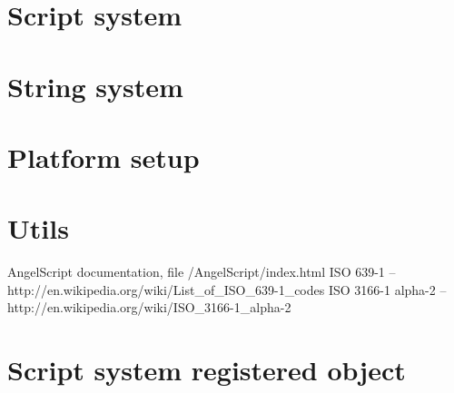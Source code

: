 \documentclass[a4paper, 12pt]{report}
\begin{document}
\chapter{Script system}



\chapter{String system}
\label{chap:string}



\chapter{Platform setup}



\chapter{Utils}
\label{chap:utils}





\begin{thebibliography}{9}
AngelScript documentation, file /AngelScript/index.html
ISO 639-1 -- http://en.wikipedia.org/wiki/List\_of\_ISO\_639-1\_codes
ISO 3166-1 alpha-2 -- http://en.wikipedia.org/wiki/ISO\_3166-1\_alpha-2
\end{thebibliography}



\clearpage
{}
\listoffigures

\clearpage
{}
\listoftables

\appendix

\chapter{Script system registered object}


\end{document}
